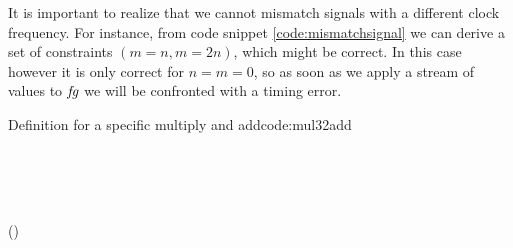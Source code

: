 It is important to realize that we cannot mismatch signals with a different clock frequency.
For instance, from code snippet \ref{code:mismatchsignal} we can derive a set of constraints $(m=n,m=2n)$, which might be correct. 
In this case however it is only correct for $n=m=0$, so as soon as we apply a stream of values to \ensuremath{\Varid{fg}} we will be confronted with a timing error.
\begin{texexptitled}{Definition for a specific multiply and add}{code:mul32add}
\begin{hscode}\SaveRestoreHook
{}%
%
\>[B]{}\mathbin{::}\langle{}\rangle\to {}\langle{}\rangle\to {}\langle{}\rangle{}\<[E]%
\\
\>[B]{}\mathrel{=}\<[E]%
\\[\blanklineskip]%
\>[B]{}\mathbin{::}\langle{}\rangle\to {}\langle{}\rangle\to {}\langle{}\;\rangle{}\<[E]%
\\
\>[B]{}\mathrel{=}\<[E]%
\ColumnHook
\end{hscode}\resethooks
\begin{hscode}\SaveRestoreHook
{}%
%
\>[B]{}\;\;\mathrel{=}\;(\;\;)\;\<[E]%
\ColumnHook
\end{hscode}\resethooks
\end{texexptitled}
